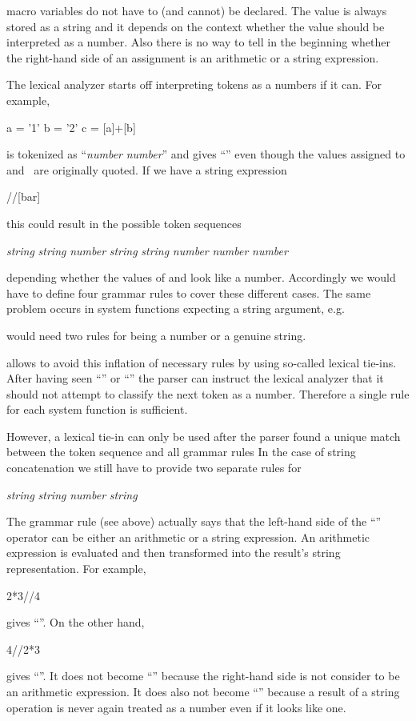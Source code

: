 \KUIP{} macro variables do not have to (and cannot) be declared.
The value is always stored as a string and it depends on the context
whether the value should be interpreted as a number.
Also there is no way to tell in the beginning whether the right-hand side of an
assignment is an arithmetic or a string expression.

The lexical analyzer starts off interpreting tokens
as a numbers if it can.
For example,
\begin{XMP}
a = '1'
b = '2'
c = [a]+[b]
\end{XMP}
is tokenized as ``\textsl{number} \Lit{+} \textsl{number}'' and
gives ``'' even though the values assigned to 
and~ are originally quoted.
If we have a string expression
\begin{XMP}
[foo]//[bar]
\end{XMP}
this could result in the possible token sequences
\begin{XMP}
\textsl{string} \Lit{//} \textsl{string}
\textsl{number} \Lit{//} \textsl{string}
\textsl{string} \Lit{//} \textsl{number}
\textsl{number} \Lit{//} \textsl{number}
\end{XMP}
depending whether the values of  and  look like a
number.
Accordingly we would have to define four grammar rules to cover these
different cases.
The same problem occurs in system functions expecting a string
argument, e.g.\
would need two rules for  being a number or a genuine string.

 allows to avoid this inflation of necessary rules by using
so-called lexical tie-ins.
After having seen ``\Lit{//}'' or ``'' the parser can
instruct the lexical analyzer that it should not attempt to classify
the next token as a number. 
Therefore a single rule for each system function is sufficient.

However, a lexical tie-in can only be used after the parser found 
a unique match between the token sequence and all grammar rules
In the case of string concatenation we still have to provide two
separate rules for
\begin{XMP}
\textsl{string} \Lit{//} \textsl{string}
\textsl{number} \Lit{//} \textsl{string}
\end{XMP}
The grammar rule (see above) actually says that the left-hand side of
the ``\Lit{//}'' operator can be either an arithmetic or a string
expression.
An arithmetic expression is evaluated and then transformed into the
result's string representation.
For example,
\begin{XMP}
2*3//4
\end{XMP}
gives ``''.
On the other hand,
\begin{XMP}
4//2*3
\end{XMP}
gives ``''.
It does not become ``'' because the right-hand side is not
consider to be an arithmetic expression.
It does also not become ``'' because a result of a string
operation is never again treated as a number even if it looks like one.

